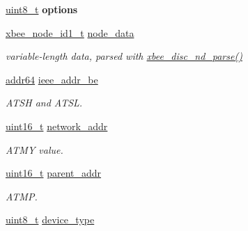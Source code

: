 \begin{DoxyCompactItemize}
\item 
\hypertarget{group__xbee__discovery_gaace3d640c8d449b8db1162993d259d3f}{\hyperlink{group__hal_gae1affc9ca37cfb624959c866a73f83c2}{uint8\-\_\-t} {\bfseries options}}\label{group__xbee__discovery_gaace3d640c8d449b8db1162993d259d3f}

\item 
\hypertarget{group__xbee__discovery_ga85b75c5bbcd6d39fb6e2802f35f926ff}{\hyperlink{group__xbee__discovery_gaf00a7a98eff47e084bf5f8741bf41220}{xbee\-\_\-node\-\_\-id1\-\_\-t} \hyperlink{group__xbee__discovery_ga85b75c5bbcd6d39fb6e2802f35f926ff}{node\-\_\-data}}\label{group__xbee__discovery_ga85b75c5bbcd6d39fb6e2802f35f926ff}

\begin{DoxyCompactList}\small\item\em variable-\/length data, parsed with \hyperlink{group__xbee__discovery_ga1efd48449a49119fc19ab9843af5ef6c}{xbee\-\_\-disc\-\_\-nd\-\_\-parse()} \end{DoxyCompactList}\item 
\hypertarget{group__xbee__discovery_ga719f89263ecae9f127dc655c1c14fdac}{\hyperlink{unionaddr64}{addr64} \hyperlink{group__xbee__discovery_ga719f89263ecae9f127dc655c1c14fdac}{ieee\-\_\-addr\-\_\-be}}\label{group__xbee__discovery_ga719f89263ecae9f127dc655c1c14fdac}

\begin{DoxyCompactList}\small\item\em A\-T\-S\-H and A\-T\-S\-L. \end{DoxyCompactList}\item 
\hypertarget{group__xbee__discovery_gac1fa8be8752da585fe6a567d4732c147}{\hyperlink{group__hal_ga5a8b2dc9e45a9ee81a94ef304fb62505}{uint16\-\_\-t} \hyperlink{group__xbee__discovery_gac1fa8be8752da585fe6a567d4732c147}{network\-\_\-addr}}\label{group__xbee__discovery_gac1fa8be8752da585fe6a567d4732c147}

\begin{DoxyCompactList}\small\item\em A\-T\-M\-Y value. \end{DoxyCompactList}\item 
\hypertarget{group__xbee__discovery_ga300e014f0c31d08adc1145613e0b0f72}{\hyperlink{group__hal_ga5a8b2dc9e45a9ee81a94ef304fb62505}{uint16\-\_\-t} \hyperlink{group__xbee__discovery_ga300e014f0c31d08adc1145613e0b0f72}{parent\-\_\-addr}}\label{group__xbee__discovery_ga300e014f0c31d08adc1145613e0b0f72}

\begin{DoxyCompactList}\small\item\em A\-T\-M\-P. \end{DoxyCompactList}\item 
\hypertarget{group__xbee__discovery_gab9c960832b7e834e6657e0c6ab4c3d8a}{\hyperlink{group__hal_gae1affc9ca37cfb624959c866a73f83c2}{uint8\-\_\-t} \hyperlink{group__xbee__discovery_gab9c960832b7e834e6657e0c6ab4c3d8a}{device\-\_\-type}}\label{group__xbee__discovery_gab9c960832b7e834e6657e0c6ab4c3d8a}


\end{DoxyCompactItemize}
